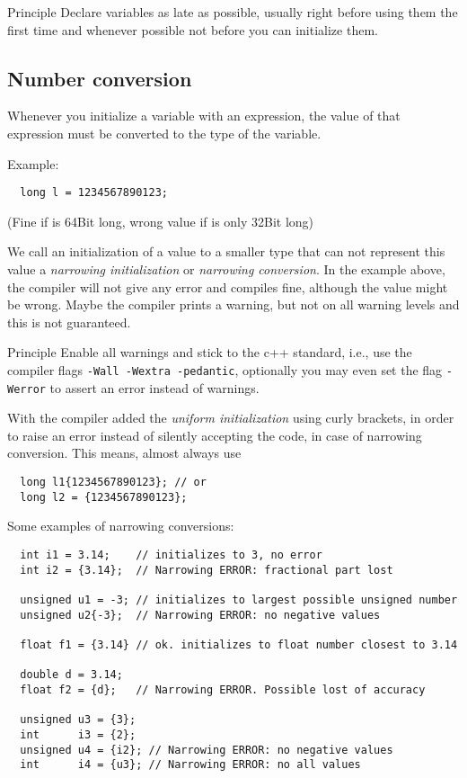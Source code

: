 \begin{guideline}{Principle}
  Declare variables as late as possible, usually right before using them the first time and whenever possible not before you can initialize them.
\end{guideline}



\subsection{Number conversion}
Whenever you initialize a variable with an expression, the value of that expression must be converted to the type of the variable.

Example:
\begin{verbatim}
  long l = 1234567890123;
\end{verbatim}
(Fine if  is 64Bit long, wrong value if  is only 32Bit long)

We call an initialization of a value to a smaller type that can not represent this value a \emph{narrowing initialization} or
\emph{narrowing conversion}. In the example above, the compiler will not give any error and compiles fine, although the value might be wrong.
Maybe the compiler prints a warning, but not on all warning levels and this is not guaranteed.

\begin{guideline}{Principle}
  Enable all warnings and stick to the c++ standard, i.e., use the compiler flags \texttt{-Wall -Wextra -pedantic}, optionally you may
  even set the flag \texttt{-Werror} to assert an error instead of warnings.
\end{guideline}

With\marginpar{[\cxx{11}]}  the compiler added the \emph{uniform initialization} using curly brackets, in order to raise an error
instead of silently accepting the code, in case of narrowing conversion. This means, almost always use
\begin{verbatim}
  long l1{1234567890123}; // or
  long l2 = {1234567890123};
\end{verbatim}

Some examples of narrowing conversions:
\begin{verbatim}
  int i1 = 3.14;    // initializes to 3, no error
  int i2 = {3.14};  // Narrowing ERROR: fractional part lost

  unsigned u1 = -3; // initializes to largest possible unsigned number
  unsigned u2{-3};  // Narrowing ERROR: no negative values

  float f1 = {3.14} // ok. initializes to float number closest to 3.14

  double d = 3.14;
  float f2 = {d};   // Narrowing ERROR. Possible lost of accuracy

  unsigned u3 = {3};
  int      i3 = {2};
  unsigned u4 = {i2}; // Narrowing ERROR: no negative values
  int      i4 = {u3}; // Narrowing ERROR: no all values
\end{verbatim}

